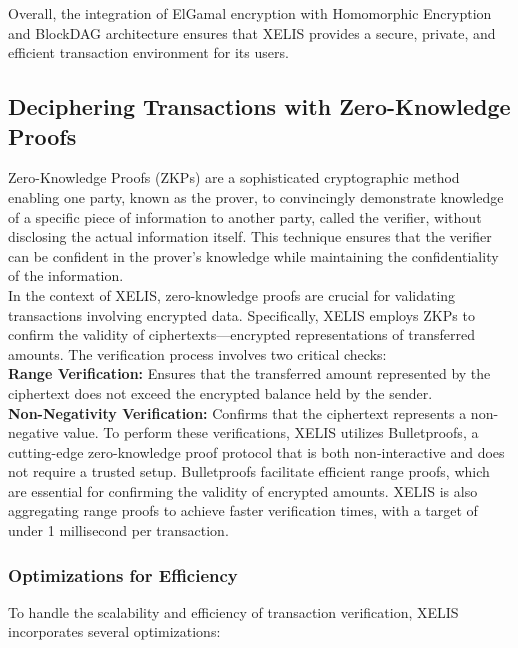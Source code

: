 \documentclass[10pt,a4paper,twocolumn]{article}
\begin{document}
Overall, the integration of ElGamal encryption with Homomorphic Encryption and BlockDAG architecture ensures that XELIS provides a secure, private, and efficient transaction environment for its users.\\

\subsection{Deciphering Transactions with Zero-Knowledge Proofs}

Zero-Knowledge Proofs (ZKPs) are a sophisticated cryptographic method enabling one party, known as the prover, to convincingly demonstrate knowledge of a specific piece of information to another party, called the verifier, without disclosing the actual information itself. This technique ensures that the verifier can be confident in the prover's knowledge while maintaining the confidentiality of the information.\\

In the context of XELIS, zero-knowledge proofs are crucial for validating transactions involving encrypted data. Specifically, XELIS employs ZKPs to confirm the validity of ciphertexts—encrypted representations of transferred amounts. The verification process involves two critical checks:\\

\textbf{Range Verification:} Ensures that the transferred amount represented by the ciphertext does not exceed the encrypted balance held by the sender.\\

\textbf{Non-Negativity Verification:} Confirms that the ciphertext represents a non-negative value.
To perform these verifications, XELIS utilizes Bulletproofs, a cutting-edge zero-knowledge proof protocol that is both non-interactive and does not require a trusted setup. Bulletproofs facilitate efficient range proofs, which are essential for confirming the validity of encrypted amounts. XELIS is also aggregating range proofs to achieve faster verification times, with a target of under 1 millisecond per transaction.\\

\subsubsection{Optimizations for Efficiency}

To handle the scalability and efficiency of transaction verification, XELIS incorporates several optimizations:\\
\end{document}
